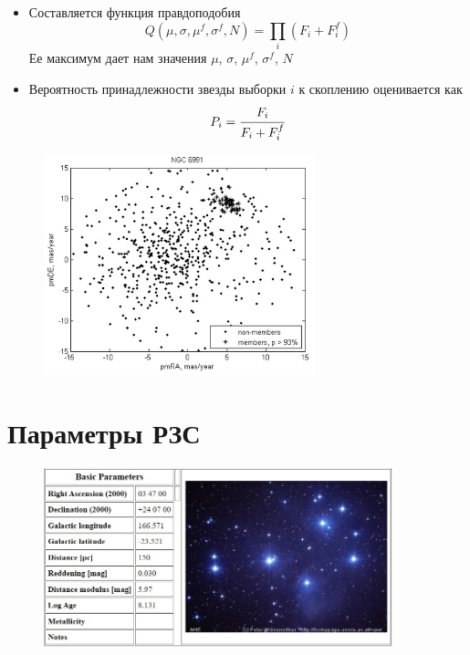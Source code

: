 \documentclass{beamer}
\begin{document}
    \begin{frame}
        \begin{itemize}
            \item Составляется функция правдоподобия
            \begin{equation*}
                Q(\mu, \sigma, \mu^f, \sigma^f, N) = \prod_i \left(F_i + F^f_i\right)
            \end{equation*}
            Ее максимум дает нам значения $\mu$, $\sigma$, $\mu^f$, $\sigma^f$, $N$
            \item Вероятность принадлежности звезды выборки $i$ к скоплению оценивается как 
            \begin{equation*}
                P_i = \cfrac{F_i}{F_i + F^f_i}
            \end{equation*}
        \end{itemize}
    \end{frame}
    \begin{frame}
        \begin{figure}
            \centering
            \includegraphics[width=0.7\textwidth]{pictures/Sansan.jpg}
        \end{figure}
    \end{frame}
    \section*{Параметры РЗС}
    \begin{frame}
        \begin{figure}
            \centering
            \includegraphics[width=0.9\textwidth]{pictures/Params.jpg}
        \end{figure}
    \end{frame}
\end{document}
